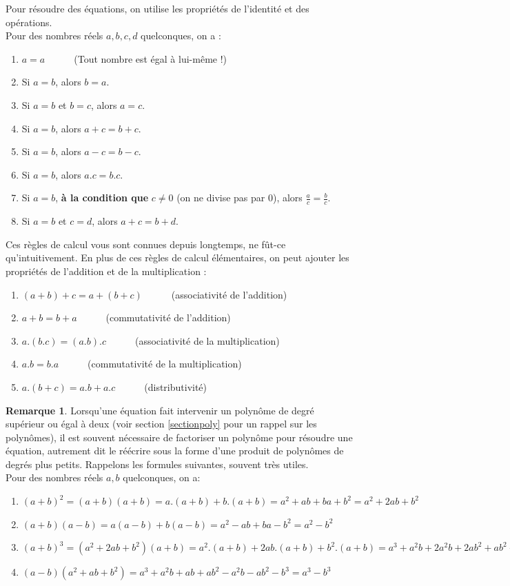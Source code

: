 \documentclass[a4paper,13pt]{scrreprt}
\theoremstyle{plain}
\theoremstyle{definition}
\newtheorem{rema}[subsection]{Remarque}
\begin{document}
\newpage

Pour résoudre des équations, on utilise les propriétés de l'identité et des opérations. \\ Pour des nombres réels $a,b,c,d$ quelconques, on a :

\begin{enumerate}
	\item $a=a$~~~~~~(Tout nombre est égal à lui-même !)
	\item Si $a=b$, alors $b=a$.
	\item Si $a=b$ et $b=c$, alors $a=c$.
	\item Si $a=b$, alors $a+c=b+c$.
	\item Si $a=b$, alors $a-c=b-c$.
	\item Si $a=b$, alors $a.c=b.c$.
	\item Si $a=b$, \textbf{à la condition que} $c \neq 0$ (on ne divise pas par $0$), alors $\frac{a}{c}=\frac{b}{c}$.
	\item Si $a=b$ et $c=d$, alors $a+c=b+d$.
\end{enumerate}
Ces règles de calcul vous sont connues depuis longtemps, ne fût-ce qu'intuitivement. En plus de ces règles de calcul élémentaires, on peut ajouter les propriétés de l'addition et de la multiplication :
\begin{enumerate}
	\item $(a+b)+c=a+(b+c)$~~~~~~(associativité de l'addition)
	\item $a+b=b+a$~~~~~~(commutativité de l'addition)
	\item $a.(b.c)=(a.b).c$~~~~~~(associativité de la multiplication)
	\item $a.b=b.a$~~~~~~(commutativité de la multiplication)
	\item $a.(b+c)=a.b+a.c$~~~~~~(distributivité)
\end{enumerate}

\begin{rema}
	Lorsqu'une équation fait intervenir un polynôme de degré supérieur ou égal à deux (voir section \ref{sectionpoly} pour un rappel sur les polynômes), il est souvent nécessaire de factoriser un polynôme pour résoudre une équation, autrement dit le réécrire sous la forme d'une produit de polynômes de degrés plus petits. Rappelons les formules suivantes, souvent très utiles. \\
	Pour des nombres réels $a,b$ quelconques, on a:
	\begin{enumerate}
		\item $(a+b)^2=(a+b)(a+b)=a.(a+b)+b.(a+b)=a^2+ab+ba+b^2=a^2+2ab+b^2$
		\item $(a+b)(a-b)=a(a-b)+b(a-b)=a^2-ab+ba-b^2=a^2-b^2$
		\item $(a+b)^3=(a^2+2ab+b^2)(a+b)=a^2.(a+b)+2ab.(a+b)+b^2.(a+b)=a^3+a^2 b + 2a^2 b + 2a b^2 + ab^2 + b^3 = a^3 + 3a^2b + 3ab^2 + b^3$
		\item $(a-b)(a^2+ab+b^2)=a^3 + a^2 b + ab + a b^2 - a^2 b - ab^2 - b^3 = a^3 - b^3$
	\end{enumerate}
\end{rema}
\end{document}
